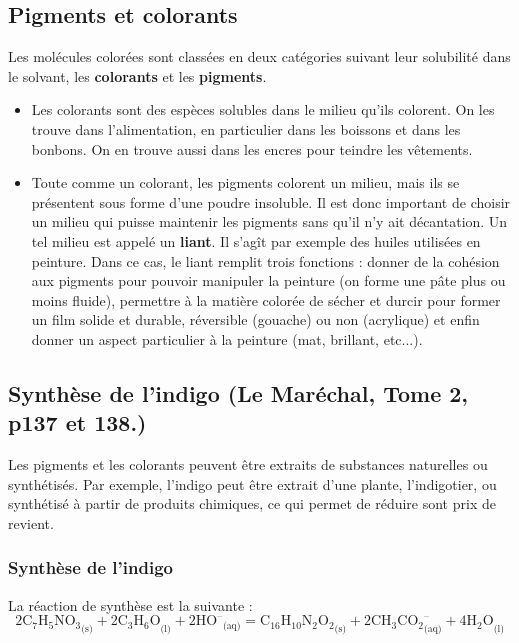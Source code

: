 \documentclass[11pt,a4paper]{report}
\begin{document}
\subsection{Pigments et colorants}

Les molécules colorées sont classées en deux catégories suivant leur solubilité dans le solvant, les \textbf{colorants} et les \textbf{pigments}.\\ 

\begin{itemize}
	\item Les colorants sont des espèces solubles dans le milieu qu'ils colorent. On les trouve dans 		l'alimentation, en particulier dans les boissons et dans les bonbons. On en trouve aussi dans les 		encres pour teindre les vêtements.\\
	
	\item Toute comme un colorant, les pigments colorent un milieu, mais ils se présentent sous forme 		d'une poudre insoluble. Il est donc important de choisir un milieu qui puisse maintenir les 			pigments sans qu'il n'y ait décantation. Un tel milieu est appelé un \textbf{liant}. Il s'agît par 		exemple des huiles utilisées en peinture. Dans ce cas, le liant remplit trois fonctions : donner de 	la cohésion aux pigments pour pouvoir manipuler la peinture (on forme une pâte plus ou moins 			fluide), permettre à la matière colorée de sécher et durcir pour former un film solide et durable, 		réversible (gouache) ou non (acrylique) et enfin donner un aspect particulier à la peinture (mat, 		brillant, etc...).	
\end{itemize}

\subsection{Synthèse de l'indigo (Le Maréchal, Tome 2, p137 et 138.)}
Les pigments et les colorants peuvent être extraits de substances naturelles ou synthétisés. Par exemple, l'indigo peut être extrait d'une plante, l'indigotier, ou synthétisé à partir de produits
chimiques, ce qui permet de réduire sont prix de revient. 

\subsubsection{Synthèse de l'indigo}
 La réaction de synthèse est la suivante :
\begin{equation}
	2{\text{C}_7\text{H}_5\text{NO}_3}_\text{(s)} + 2{\text{C}_3\text{H}_6\text{O}}_\text{(l)} 
	+ 2{\text{HO}^{–}}_\text{(aq)}  = {\text{C}_{16}\text{H}_{10}\text{N}_2\text{O}_2}_\text{(s)}
	+ 2{\text{CH}_3\text{CO}_2}^{–}_\text{(aq)} + 4{\text{H}_2\text{O}}_\text{(l)}	 
\end{equation}
\end{document}
